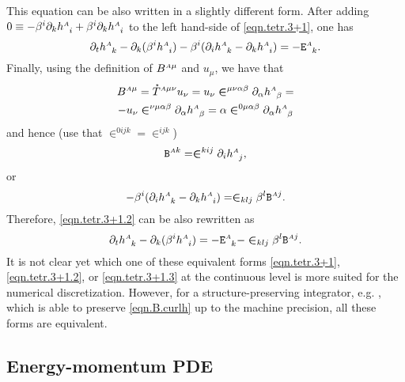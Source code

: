\documentclass[
10pt, %
a4paper, %
oneside, %
twocolumn,
headinclude,footinclude, %
BCOR5mm, %
]{scrartcl}
\newcommand{\sA}{\mathsmaller A}
\newcommand{\pd}[1]{\partial_{#1}}
\newcommand{\tetrsymbol}{h}
\newcommand{\tetr}[2]{\tetrsymbol^{#1}_{\phantom{#1}#2}}
\newcommand{\aD}[2]{\mathcal{D}_{\phantom{#2}#1}^{#2}}	%
\newcommand{\Efin}[2]{\mathtt{E}^{#1}_{\phantom{#1}#2}}	%
\newcommand{\BT}[2]{B^{#1#2}}	%
\newcommand{\Bfin}[2]{\mathtt{B}^{#1#2}}	%
\newcommand{\aU}{\mathcal{U}}%
\newcommand{\LCsymb}{\bm{\in}}    %
\newcommand{\HDT}[1]{\accentset{\star}{T}^{#1}}
\begin{document}
	This equation can be also written in a slightly different form. After adding $ 0\equiv - 
	\beta^i 
	\pd{k}\tetr{\sA}{i} + \beta^i \pd{k}\tetr{\sA}{i} $ to the left hand-side of 
	\eqref{eqn.tetr.3+1}, 
	one 
	has  
	\begin{equation}\label{eqn.tetr.3+1.2}
		\pd{t} \tetr{\sA}{k} - \pd{k} (\beta^i \tetr{\sA}{i}) - \beta^i (\pd{i}\tetr{\sA}{k} - 
		\pd{k}\tetr{\sA}{i})
		= 
		-\Efin{\sA}{k}.
	\end{equation}
	Finally, using the definition of $ \BT{\sA}{\mu} $ and $ u_\mu $, we have that 
	\begin{multline}
		\BT{\sA}{\mu} = \HDT{\sA\mu\nu} u_\nu = u_\nu \LCsymb^{\mu\nu\alpha\beta} 
		\pd{\alpha}\tetr{\sA}{\beta} = \\
		-
		u_\nu \LCsymb^{\nu\mu\alpha\beta} \pd{\alpha}\tetr{\sA}{\beta} =
		\alpha \LCsymb^{0\mu\alpha\beta} \pd{\alpha}\tetr{\sA}{\beta} 
	\end{multline}
	and hence (use that $ \LCsymb^{0ijk} =\LCsymb^{ijk} $)
	\begin{equation}\label{eqn.B.curlh}
		\Bfin{\sA}{k} = \LCsymb^{kij}\pd{i}\tetr{\sA}{j},
	\end{equation}
	or
	\begin{equation}
		-\beta^i (\pd{i}\tetr{\sA}{k} - 
		\pd{k}\tetr{\sA}{i})
		=
		\LCsymb_{klj}\beta^l \Bfin{\sA}{j}.
	\end{equation}
	Therefore, \eqref{eqn.tetr.3+1.2} can be also rewritten as 
	\begin{equation}\label{eqn.tetr.3+1.3}
		\pd{t} \tetr{\sA}{k} - \pd{k} (\beta^i \tetr{\sA}{i}) =  
		-\Efin{\sA}{k} - \LCsymb_{klj} \beta^l \Bfin{\sA}{j}.
	\end{equation}
	It is not clear yet which one of these equivalent forms
	\eqref{eqn.tetr.3+1}, \eqref{eqn.tetr.3+1.2}, or \eqref{eqn.tetr.3+1.3} at
	the continuous level is more suited for the numerical discretization.
	However, for a structure-preserving integrator, e.g.
	\cite{SIGPR2021,Olivares2022,oliynyk2025}, which is able  to preserve \eqref{eqn.B.curlh}
	up to the machine precision, all these forms are equivalent.
	
	
	
	
	
	\subsection{Energy-momentum PDE}\label{sec.energymomentum}
	
\end{document}

